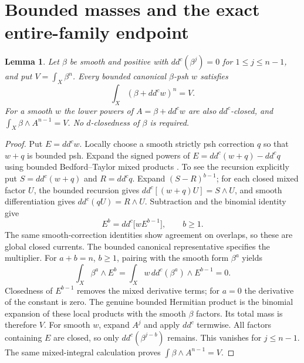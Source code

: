 \documentclass[11pt]{article}
\newcommand{\ddc}{dd^c}
\newtheorem{lemma}[theorem]{Lemma}
\theoremstyle{remark}\newtheorem{remark}[theorem]{Remark}
\begin{document}
\section{Bounded masses and the exact entire-family endpoint}
\begin{lemma}\label{lem:mass}
Let $\beta$ be smooth and positive with
$\ddc(\beta^j)=0$ for $1\leq j\leq n-1$, and put
$V=\int_X\beta^n$. Every bounded canonical $\beta$-psh $w$ satisfies
\[
 \int_X(\beta+\ddc w)^n=V.
\]
For a smooth $w$ the lower powers of $A=\beta+\ddc w$ are also
$dd^c$-closed, and $\int_X\beta\wedge A^{n-1}=V$.
No $d$-closedness of $\beta$ is required.
\end{lemma}
\begin{proof}
Put $E=\ddc w$. Locally choose a smooth strictly psh correction $q$
so that $w+q$ is bounded psh. Expand the signed powers of
$E=\ddc(w+q)-\ddc q$ using bounded Bedford--Taylor mixed products
\cite[equation (2.1), Theorems 2.1, 2.4, 2.10 and Corollary 2.2]{BT}.
To see the recursion explicitly put $S=\ddc(w+q)$ and $R=\ddc q$.
Expand $(S-R)^{b-1}$; for each closed mixed factor $U$,
the bounded recursion gives $\ddc[(w+q)U]=S\wedge U$, and smooth
differentiation gives $\ddc(qU)=R\wedge U$. Subtraction and the
binomial identity give
\[
 E^b=\ddc\bigl[w E^{b-1}\bigr],\qquad b\geq1.
\]
The same smooth-correction identities show agreement on overlaps,
so these are global closed currents. The bounded canonical
representative specifies the multiplier.
For $a+b=n$, $b\geq1$, pairing with the smooth form $\beta^a$ yields
\[
 \int_X\beta^a\wedge E^b
   =\int_Xw\,\ddc(\beta^a)\wedge E^{b-1}=0.
\]
Closedness of $E^{b-1}$ removes the mixed derivative terms; for $a=0$
the derivative of the constant is zero. The genuine bounded Hermitian
product is the binomial expansion of these local products with the
smooth $\beta$ factors. Its total mass is therefore $V$.
For smooth $w$, expand $A^j$ and apply $dd^c$ termwise. All factors
containing $E$ are closed, so only $\ddc(\beta^{j-b})$ remains.
This vanishes for $j\leq n-1$. The same mixed-integral calculation
proves $\int\beta\wedge A^{n-1}=V$.
\end{proof}
\end{document}
